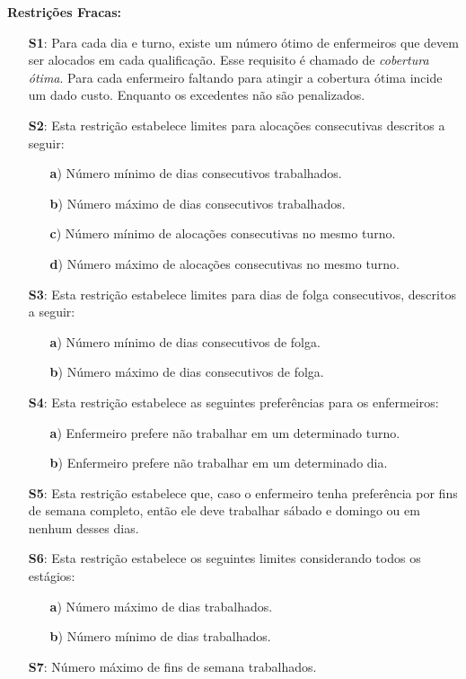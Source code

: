 \documentclass[cic,tc, twoside]{iiufrgs}
\begin{document}
\bigskip
\noindent\textbf{Restrições Fracas:}
\begin{itemize}
    \item [\textbf{S1}:] Para cada dia e turno, existe um número ótimo de enfermeiros que devem ser alocados em cada qualificação. Esse requisito é chamado de \textit{cobertura ótima}. Para cada enfermeiro faltando para atingir a cobertura ótima incide um dado custo. Enquanto os excedentes não são penalizados.

    \item [\textbf{S2}:] Esta restrição estabelece limites para alocações consecutivas descritos a seguir:
       \begin{itemize}[nosep]
			\item [\textbf{a})] Número mínimo de dias consecutivos trabalhados.
			\item [\textbf{b})] Número máximo de dias consecutivos trabalhados.
			\item [\textbf{c})] Número mínimo de alocações consecutivas no mesmo turno.
			\item [\textbf{d})] Número máximo de alocações consecutivas no mesmo turno.			
		\end{itemize}  

    \item [\textbf{S3}:] Esta restrição estabelece limites para dias de folga consecutivos, descritos a seguir:
		\begin{itemize}[nosep]
			\item [\textbf{a})] Número mínimo de dias consecutivos de folga.
			\item [\textbf{b})] Número máximo de dias consecutivos de folga.	
		\end{itemize}  
		
    \item [\textbf{S4}:] Esta restrição estabelece as seguintes preferências para os enfermeiros:
		\begin{itemize}[nosep]
			\item [\textbf{a})] Enfermeiro prefere não trabalhar em um determinado turno.
			\item [\textbf{b})] Enfermeiro prefere não trabalhar em um determinado dia.
		\end{itemize} 
    \item [\textbf{S5}:] Esta restrição estabelece que, caso o enfermeiro tenha preferência por fins de semana completo, então ele deve trabalhar sábado e domingo ou em nenhum desses dias.
    \item [\textbf{S6}:] Esta restrição estabelece os seguintes limites considerando todos os estágios:
		\begin{itemize}[nosep]
			\item [\textbf{a})] Número máximo de dias trabalhados.
			\item [\textbf{b})] Número mínimo de dias trabalhados.
		\end{itemize} 

    \item [\textbf{S7}:] Número máximo de fins de semana trabalhados. 
\end{itemize}
\end{document}
